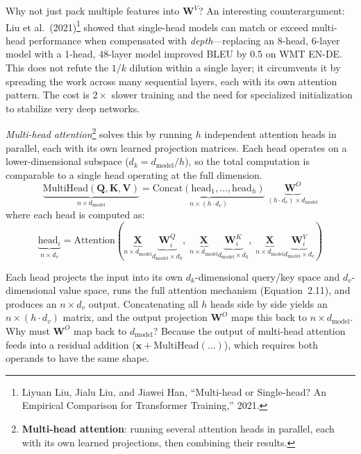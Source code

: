 \begin{whynotbox}{Why not just pack multiple features into $\mathbf{W}^V$?}
An interesting counterargument: Liu et al.\ (2021)\footnote{Liyuan Liu, Jialu Liu, and Jiawei Han, ``Multi-head or Single-head? An Empirical Comparison for Transformer Training,'' 2021.} showed that single-head models can match or exceed multi-head performance when compensated with \emph{depth}---replacing an 8-head, 6-layer model with a 1-head, 48-layer model improved BLEU by 0.5 on WMT EN-DE. This does not refute the $1/k$ dilution within a single layer; it circumvents it by spreading the work across many sequential layers, each with its own attention pattern. The cost is $2\times$ slower training and the need for specialized initialization to stabilize very deep networks.
\end{whynotbox}

\emph{Multi-head attention}\footnote{\textbf{Multi-head attention}: running several attention heads in parallel, each with its own learned projections, then combining their results.} solves this by running $h$ independent attention heads in parallel, each with its own learned projection matrices. Each head operates on a lower-dimensional subspace ($d_k = d_{\text{model}}/h$), so the total computation is comparable to a single head operating at the full dimension.
\begin{equation}
\label{eq:multihead}
\underbrace{\text{MultiHead}(\mathbf{Q}, \mathbf{K}, \mathbf{V})}_{n \times d_{\text{model}}} = \underbrace{\text{Concat}(\text{head}_1, \ldots, \text{head}_h)}_{n \times (h \cdot d_v)} \;\underbrace{\mathbf{W}^O}_{(h \cdot d_v) \times d_{\text{model}}}
\end{equation}
where each head is computed as:
\begin{equation}
\underbrace{\text{head}_i}_{n \times d_v} = \text{Attention}\!\left(\underbrace{\mathbf{X}}_{n \times d_{\text{model}}} \underbrace{\mathbf{W}_i^Q}_{d_{\text{model}} \times d_k},\; \underbrace{\mathbf{X}}_{n \times d_{\text{model}}} \underbrace{\mathbf{W}_i^K}_{d_{\text{model}} \times d_k},\; \underbrace{\mathbf{X}}_{n \times d_{\text{model}}} \underbrace{\mathbf{W}_i^V}_{d_{\text{model}} \times d_v}\right)
\end{equation}

Each head projects the input into its own $d_k$-dimensional query/key space and $d_v$-dimensional value space, runs the full attention mechanism (Equation~2.11), and produces an $n \times d_v$ output. Concatenating all $h$ heads side by side yields an $n \times (h \cdot d_v)$ matrix, and the output projection $\mathbf{W}^O$ maps this back to $n \times d_{\text{model}}$. Why must $\mathbf{W}^O$ map back to $d_{\text{model}}$? Because the output of multi-head attention feeds into a residual addition ($\mathbf{x} + \text{MultiHead}(\ldots)$), which requires both operands to have the same shape.

